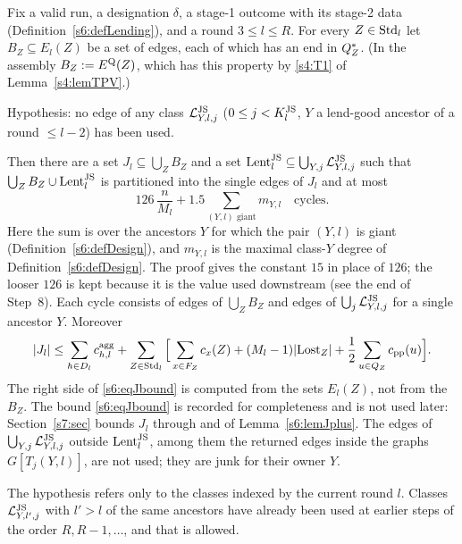 \begin{lemma}\label{s6:lemJSLC}
Fix a valid run, a designation $\delta$, a stage-1 outcome with its stage-2 data (Definition~\ref{s6:defLending}), and a round $3\le l\le R$. For every $Z\in\mathrm{Std}_l$ let $B_Z\subseteq E_l(Z)$ be a set of edges, each of which has an end in $Q^{*}_Z$. (In the assembly $B_Z:=E^{\mathrm{Q}}(Z)$, which has this property by \ref{s4:T1} of Lemma~\ref{s4:lemTPV}.)

Hypothesis: no edge of any class $\mathcal{L}^{\mathrm{JS}}_{Y,l,j}$ ($0\le j<K^{\mathrm{JS}}_l$, $Y$ a lend-good ancestor of a round $\le l-2$) has been used.

Then there are a set $J_l\subseteq\bigcup_ZB_Z$ and a set $\mathrm{Lent}^{\mathrm{JS}}_l\subseteq\bigcup_{Y,j}\mathcal{L}^{\mathrm{JS}}_{Y,l,j}$ such that $\bigcup_ZB_Z\cup\mathrm{Lent}^{\mathrm{JS}}_l$ is partitioned into the single edges of $J_l$ and at most
\[
126\,\frac n{M_l}+1.5\sum_{(Y,l)\text{ giant}}m_{Y,l}\quad\text{cycles}.
\]
Here the sum is over the ancestors $Y$ for which the pair $(Y,l)$ is giant (Definition~\ref{s6:defDesign}), and $m_{Y,l}$ is the maximal class-$Y$ degree of Definition~\ref{s6:defDesign}. The proof gives the constant $15$ in place of $126$; the looser $126$ is kept because it is the value used downstream (see the end of Step~8). Each cycle consists of edges of $\bigcup_ZB_Z$ and edges of $\bigcup_j\mathcal{L}^{\mathrm{JS}}_{Y,l,j}$ for a single ancestor $Y$. Moreover
\begin{equation}\label{s6:eqJbound}
|J_l|\le\sum_{h\in D_l}c^{\mathrm{agg}}_{h,l}+\sum_{Z\in\mathrm{Std}_l}\Big[\sum_{x\in F_Z}c_x(Z)+(M_l-1)|\mathrm{Lost}_Z|+\frac12\sum_{u\in Q_Z}c_{\mathrm{pp}}(u)\Big].
\end{equation}
The right side of \eqref{s6:eqJbound} is computed from the sets $E_l(Z)$, not from the $B_Z$. The bound \eqref{s6:eqJbound} is recorded for completeness and is not used later: Section~\ref{s7:sec} bounds $J_l$ through  and  of Lemma~\ref{s6:lemJplus}. The edges of $\bigcup_{Y,j}\mathcal{L}^{\mathrm{JS}}_{Y,l,j}$ outside $\mathrm{Lent}^{\mathrm{JS}}_l$, among them the returned edges inside the graphs $G[T_j(Y,l)]$, are not used; they are junk for their owner $Y$.
\deps{\ref{s6:lemPAR}, \ref{s6:lemMED}, \ref{s6:lemEQLPT}, \ref{s6:lemHCCP}, \ref{s6:lemHCCglob}, \ref{s6:defDesign}, \ref{s6:defLending}, \ref{s3:lemCOL}, \ref{s3:lemMonotone}, \ref{s2:lemEL}, \ref{s2:lemCap}, \ref{s2:propOV}, \ref{s2:lemTower}, \ref{s2:defHBtp}, \ref{s2:propStructure}, \ref{s3:defCOL}, \ref{s1:citDef7}}
\end{lemma}

The hypothesis refers only to the classes indexed by the current round $l$. Classes $\mathcal{L}^{\mathrm{JS}}_{Y,l',j}$ with $l'>l$ of the same ancestors have already been used at earlier steps of the order $R,R-1,\dots$, and that is allowed.

